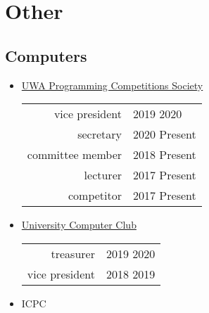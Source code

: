 \documentclass[a4paper]{style}
\begin{document}
\begin{minipage}[t]{0.45\textwidth}
\sectionspace{} %


\section{Other}
\subsection{Computers}
\vspace{5pt}
\begin{itemize}
    \item \href{https://pcs.org.au/about/}{UWA Programming Competitions Society}
        \begin{tabular}{r|l}
            vice president & 2019 \textendash{} 2020 \\
            secretary & 2020 \textendash{} Present \\
            committee member & 2018 \textendash{} Present \\
            lecturer & 2017 \textendash{} Present \\
            competitor & 2017 \textendash{} Present
        \end{tabular}
    \item \href{https://ucc.asn.au}{University Computer Club} \\
        \begin{tabular}{r|l}
            \hspace{20pt} treasurer & 2019 \textendash{} 2020 \\
            \hspace{22pt} vice president & 2018 \textendash{} 2019
        \end{tabular}
    \item ICPC
\end{itemize}

\end{minipage}
\end{document}
